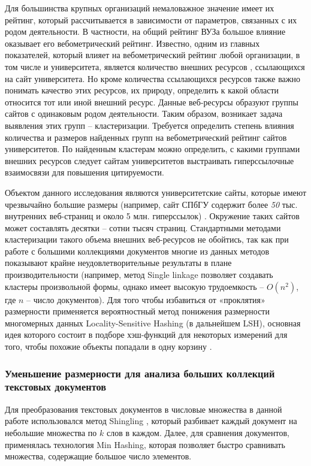 Для большинства крупных организаций немаловажное значение имеет их рейтинг, который рассчитывается в зависимости от параметров, связанных с их родом деятельности. В частности, на общий рейтинг ВУЗа большое влияние оказывает его вебометрический рейтинг. Известно, одним из главных показателей, который влияет на вебометрический рейтинг любой организации, в том числе и университета, является количество внешних ресурсов \cite{RankingWeb}, ссылающихся на сайт университета. Но кроме количества ссылающихся ресурсов также важно понимать качество этих ресурсов, их природу, определить к какой области относится тот или иной внешний ресурс. Данные веб-ресурсы образуют группы сайтов с одинаковым родом деятельности. Таким образом, возникает задача выявления этих групп -- кластеризации. Требуется определить степень влияния количества и размеров найденных групп на вебометрический рейтинг сайтов университетов. По найденным кластерам можно определить, с какими группами внешних ресурсов следует сайтам университетов выстраивать гиперссылочные взаимосвязи для повышения цитируемости.

Объектом данного исследования являются университетские сайты, которые имеют чрезвычайно большие размеры (например, сайт СПбГУ содержит более \textit{50} тыс. внутренних веб-страниц и около 5 млн. гиперссылок) \cite{BlekanovMoskalets,BlekanovSergeevMaksimovBOWTIE}. Окружение таких сайтов может составлять десятки – сотни тысяч страниц. Стандартными методами кластеризации такого объема внешних веб-ресурсов не обойтись, так как при работе с большими коллекциями документов многие из данных методов показывают крайне неудовлетворительные результаты в плане производительности \cite{EneImMoseley} (например, метод Single linkage позволяет создавать кластеры произвольной формы, однако имеет высокую трудоемкость -- \(O(n^2)\), где \(n\) -- число документов). Для того чтобы избавиться от «проклятия» размерности применяется вероятностный метод понижения размерности многомерных данных Locality-Sensitive Hashing (в дальнейшем LSH), основная идея которого состоит в подборе хэш-функций для некоторых измерений для того, чтобы похожие объекты попадали в одну корзину \cite{Buhler}.

\subsubsection{Уменьшение размерности для анализа больших коллекций текстовых документов}

Для преобразования текстовых документов в числовые множества в данной работе использовался метод Shingling \cite{Broder}, который разбивает каждый документ на небольшие множества по \(k\) слов в каждом. Далее, для сравнения документов, применялась технология Min Hashing, которая позволяет быстро сравнивать множества, содержащие большое число элементов.

